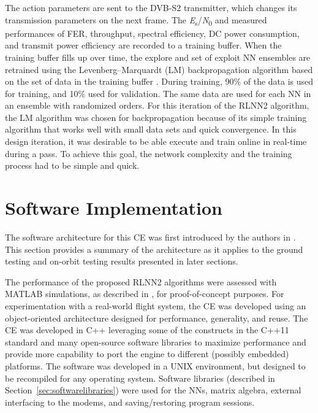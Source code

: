 \documentclass[journal]{IEEEtran}
\begin{document}
The action parameters are sent to the DVB-S2 transmitter, which changes its transmission parameters on the next frame.  The \textit{E}\textsubscript{s}/\textit{N}\textsubscript{0} and measured performances of FER, throughput, spectral efficiency, DC power consumption, and transmit power efficiency are recorded to a training buffer.  When the training buffer fills up over time, the explore and set of exploit NN ensembles are retrained using the Levenberg--Marquardt (LM) backpropagation algorithm \cite{levenberg-marquardt} based on the set of data in the training buffer \cite{paulo-jrnl}.  During training, 90\% of the data is used for training, and 10\% used for validation.  The same data are used for each NN in an ensemble with randomized orders.  For this iteration of the RLNN2 algorithm, the LM algorithm was chosen for backpropagation because of its simple training algorithm that works well with small data sets and quick convergence.  In this design iteration, it was desirable to be able execute and train online in real-time during a pass.  To achieve this goal, the network complexity and the training process had to be simple and quick.

\section{Software Implementation} \label{sec:softwareimplementation}
The software architecture for this CE was first introduced by the authors in \cite{tim-ccaa}.  This section provides a summary of the architecture as it applies to the ground testing and on-orbit testing results presented in later sections.

The performance of the proposed RLNN2 algorithms were assessed with MATLAB simulations, as described in \cite{paulo-jrnl}, for proof-of-concept purposes.  For experimentation with a real-world flight system, the CE was developed using an object-oriented architecture designed for performance, generality, and reuse.  The CE was developed in C++ leveraging some of the constructs in the C++11 standard \cite{c++11-standard} and many open-source software libraries to maximize performance and provide more capability to port the engine to different (possibly embedded) platforms.  The software was developed in a UNIX environment, but designed to be recompiled for any operating system.  Software libraries (described in Section~\ref{sec:softwarelibraries}) were used for the NNs, matrix algebra, external interfacing to the modems, and saving/restoring program sessions.
\end{document}
